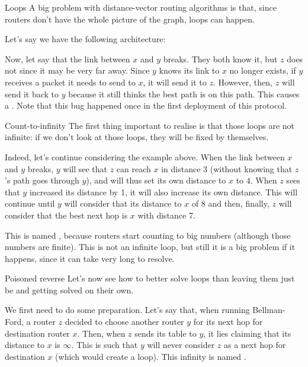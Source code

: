\documentclass[a4paper]{article}
\begin{document}
\begin{parag}{Loops}
    A big problem with distance-vector routing algorithms is that, since routers don't have the whole picture of the graph, loops can happen.

    Let's say we have the following architecture:

    Now, let say that the link between $x$ and $y$ breaks. They both know it, but $z$ does not since it may be very far away. Since $y$ knows its link to $x$ no longer exists, if $y$ receives a packet it needs to send to $x$, it will send it to $z$. However, then, $z$ will send it back to $y$ because it still thinks the best path is on this path. This causes a . Note that this bug happened once in the first deployment of this protocol.

    \begin{subparag}{Count-to-infinity}
        The first thing important to realise is that those loops are not infinite: if we don't look at those loops, they will be fixed by themselves. 

        Indeed, let's continue considering the example above. When the link between $x$ and $y$ breaks, $y$ will see that $z$ can reach $x$ in distance 3 (without knowing that $z$'s path goes through $y$), and will thus set its own distance to $x$ to $4$. When $z$ sees that $y$ increased its distance by 1, it will also increase its own distance. This will continue until $y$ will consider that its distance to $x$ of $8$ and then, finally, $z$ will consider that the best next hop is $x$ with distance 7. 

        This is named , because routers start counting to big numbers (although those numbers are finite). This is not an infinite loop, but still it is a big problem if it happens, since it can take very long to resolve.
    \end{subparag}
    
    \begin{subparag}{Poisoned reverse}
        Let's now see how to better solve loops than leaving them just be and getting solved on their own.

        We first need to do some preparation. Let's say that, when running Bellman-Ford, a router $z$ decided to choose another router $y$ for its next hop for destination router $x$. Then, when $z$ sends its table to $y$, it lies claiming that its distance to $x$ is $\infty$. This is such that $y$ will never consider $z$ as a next hop for destination $x$ (which would create a loop). This infinity is named .


\end{subparag}
\end{parag}
\end{document}
